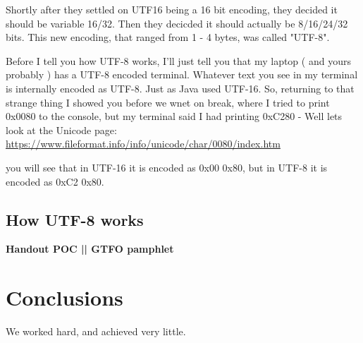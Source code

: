 \documentclass[12pt]{article}
\begin{document}
Shortly after they settled on UTF16 being a 16 bit encoding, they decided it should be variable 16/32. Then they decicded it should actually be 8/16/24/32 bits. This new encoding, that ranged from 1 - 4 bytes, was called "UTF-8". 

Before I tell you how UTF-8 works, I'll just tell  you that my laptop ( and yours probably ) has a UTF-8 encoded terminal. Whatever text you see in my terminal is internally encoded as UTF-8. Just as Java used UTF-16. So, returning to that strange thing I showed you before we wnet on break, where I tried to print 0x0080 to the console, but my terminal said I had printing 0xC280 - Well lets look at the Unicode page:
\url{https://www.fileformat.info/info/unicode/char/0080/index.htm}

you will see that in UTF-16 it is encoded as 0x00 0x80, but in UTF-8 it is encoded as 0xC2 0x80.

\subsection{How UTF-8 works}

\begin{center}
\textbf{Handout POC || GTFO pamphlet}
\end{center}

\section{Conclusions}\label{conclusions}
We worked hard, and achieved very little.
\end{document}
